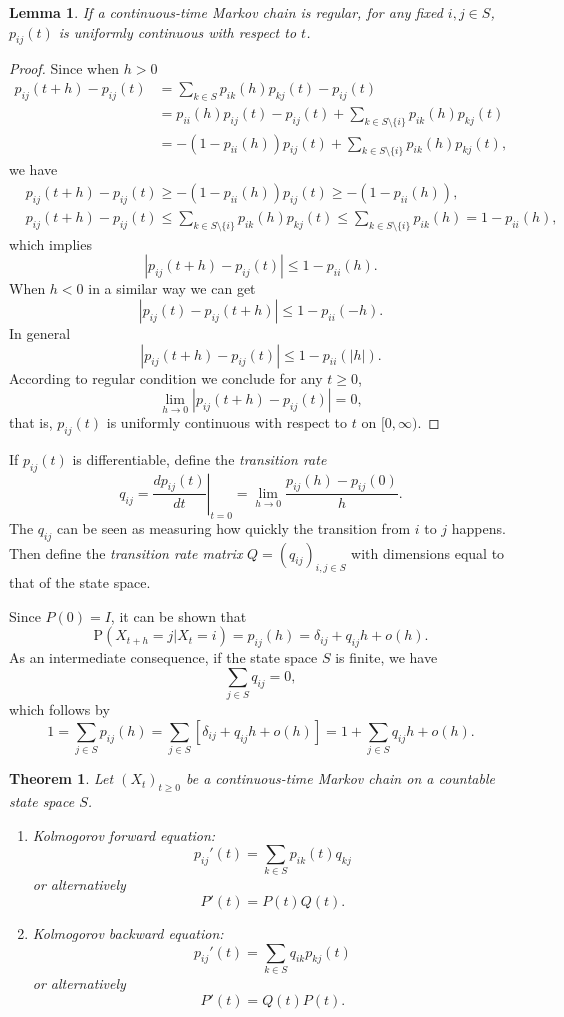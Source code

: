 \documentclass{article}
\newtheorem{theorem}{Theorem}[section]
\newtheorem{lemma}{Lemma}[section]
\theoremstyle{nonumberplain}
\newtheorem{proof}{Proof.}
\begin{document}
\begin{lemma}
	If a continuous-time Markov chain is regular, for any fixed $i,j\in S$, $p_{ij}(t)$ is uniformly continuous with respect to $t$. 
\end{lemma}
\begin{proof}
	Since when $h>0$
	\[
	\begin{aligned}
		p_{ij}(t+h)-p_{ij}(t)&=\sum_{k\in S}p_{ik}(h)p_{kj}(t)-p_{ij}(t)\\
		&= p_{ii}(h)p_{ij}(t)-p_{ij}(t)+\sum_{k\in S\setminus\{i\}}p_{ik}(h)p_{kj}(t)\\
		&= -(1-p_{ii}(h))p_{ij}(t)+\sum_{k\in S\setminus\{i\}}p_{ik}(h)p_{kj}(t),
	\end{aligned}
	\]
	we have
	\[
	\begin{aligned}
	&p_{ij}(t+h)-p_{ij}(t)\ge -(1-p_{ii}(h))p_{ij}(t)\ge-(1-p_{ii}(h)),\\
	&p_{ij}(t+h)-p_{ij}(t)\le\sum_{k\in S\setminus\{i\}} p_{ik}(h)p_{kj}(t)\le \sum_{k\in S\setminus\{i\}}p_{ik}(h)=1-p_{ii}(h),	
	\end{aligned}
	\]
	which implies
	\[
	|p_{ij}(t+h)-p_{ij}(t)|\le 1-p_{ii}(h).
	\]
	When $h<0$ in a similar way we can get
	\[
	|p_{ij}(t)-p_{ij}(t+h)|\le 1-p_{ii}(-h).
	\]
	In general
	\[
	|p_{ij}(t+h)-p_{ij}(t)|\le 1-p_{ii}(|h|).
	\]
	According to regular condition we conclude for any $t\ge0$,
	\[
	\lim_{h\to0}|p_{ij}(t+h)-p_{ij}(t)|=0,
	\]
	that is, $p_{ij}(t)$ is uniformly continuous with respect to $t$ on $[0,\infty)$.
\end{proof}
If $p_{ij}(t)$ is differentiable, define the \emph{transition rate} 
\[
q_{ij}=\left.\frac{dp_{ij}(t)}{dt}\right|_{t=0}=\lim\limits_{h\to 0}\frac{p_{ij}(h)-p_{ij}(0)}{h}.
\]
The $q_{ij}$ can be seen as measuring how quickly the transition from $i$ to $j$ happens. Then define the \emph{transition rate matrix} $Q=(q_{ij})_{i,j\in S}$ with dimensions equal to that of the state space. 

\noindent Since $P(0)=I$, it can be shown that
\[
\mathrm{P}(X_{t+h}=j| X_t=i)=p_{ij}(h)=\delta _{ij}+q_{ij}h+o(h). 
\]
As an intermediate consequence, if the state space $S$ is finite, we have   
\[
\sum_{j\in S}q_{ij}=0,
\]
which follows by
\[
1=\sum_{j\in S}p_{ij}(h)=\sum_{j\in S}[\delta _{ij}+q_{ij}h+o(h)]=1+\sum_{j\in S}q_{ij}h+o(h).
\]
\begin{theorem}
	Let $(X_t)_{t\ge0}$ be a continuous-time Markov chain on a countable state space $S$.
	\begin{enumerate}
		\item Kolmogorov forward equation:
		\[
		p_{ij}'(t)=\sum_{k\in S}p_{ik}(t)q_{kj}
		\]
		or alternatively
		\[
		P'(t)=P(t)Q(t).
		\]
		\item Kolmogorov backward equation:
		\[
		p_{ij}'(t)=\sum_{k\in S}q_{ik}p_{kj}(t)
		\]
		or alternatively
		\[
		P'(t)=Q(t)P(t).
		\]
	\end{enumerate}
\end{theorem}
\end{document}

